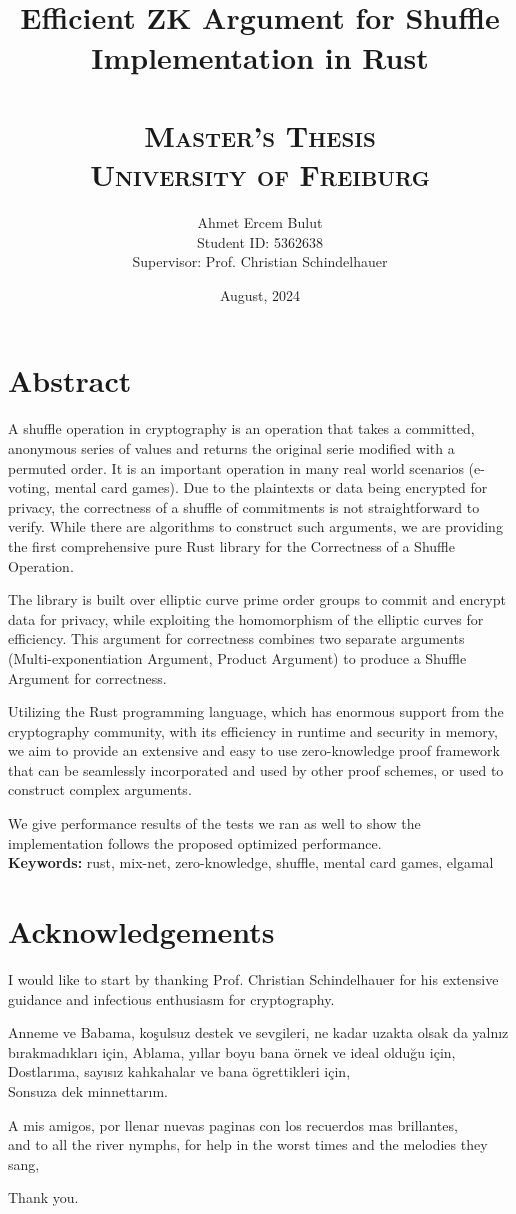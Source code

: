 \documentclass[12pt,a4paper]{report}
\title{
    \HRule \\[0.4cm]
    {\huge \bfseries  Efficient ZK Argument for Shuffle Implementation in Rust \\[0.4cm]}
    \HRule \\[1.5cm]
    \textsc{\Large Master's Thesis}\\[0.5cm]
    \textsc{\large University of Freiburg}\\[0.5cm]
}
\author{
    \Large Ahmet Ercem Bulut\\
    \Large Student ID: 5362638\\
    \Large Supervisor: Prof. Christian Schindelhauer
}
\date{August, 2024}
\begin{document}


\maketitle
\thispagestyle{empty}
\newpage

\chapter*{Abstract}
A shuffle operation in cryptography is an operation that takes a committed, anonymous series of values and returns the original serie modified with a permuted order. 
It is an important operation in many real world scenarios (e-voting, mental card games).
Due to the plaintexts or data being encrypted for privacy, the correctness of a shuffle of commitments is not straightforward to verify. While there are algorithms to construct such arguments, we are providing the first comprehensive 
pure Rust library for the Correctness of a Shuffle Operation.\par
The library is built over elliptic curve prime order groups 
to commit and encrypt data for privacy, while exploiting the homomorphism of the elliptic curves for efficiency.
This argument for correctness combines two separate arguments (Multi-exponentiation Argument, Product Argument) to produce a Shuffle Argument for correctness.\par 
Utilizing the Rust programming language, which has enormous support from the cryptography community, with its efficiency in runtime and security in memory, 
we aim to provide an extensive and easy to use zero-knowledge proof
framework that can be seamlessly incorporated and used by other proof schemes, or used to construct complex arguments.\par
We give performance results of the tests we ran as well to show the implementation follows the proposed optimized performance.\\
\textbf{Keywords:} rust, mix-net, zero-knowledge, shuffle, mental card games, elgamal

\newpage

\chapter*{Acknowledgements}
I would like to start by thanking Prof. Christian Schindelhauer for his extensive guidance and infectious enthusiasm for cryptography.\par
Anneme ve Babama, koşulsuz destek ve sevgileri, ne kadar uzakta olsak da yalnız bırakmadıkları için,
Ablama, yıllar boyu bana örnek ve ideal olduğu için,
Dostlarıma, sayısız kahkahalar ve bana ögrettikleri için,\\
Sonsuza dek minnettarım.\par
A mis amigos, por llenar nuevas paginas con los recuerdos mas brillantes,\\
and to all the river nymphs, for help in the worst times and the melodies they sang,\par
Thank you.
\end{document}
